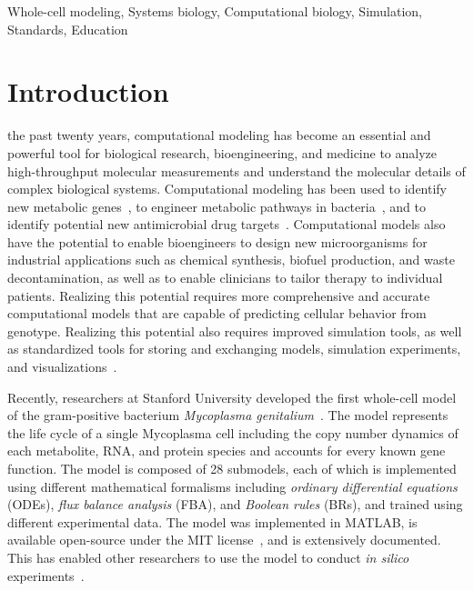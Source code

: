 \documentclass[journal,transmag]{IEEEtran}
\begin{document}
\begin{IEEEkeywords}
Whole-cell modeling, Systems biology, Computational biology, Simulation, Standards, Education
\end{IEEEkeywords}

\IEEEpeerreviewmaketitle

\section{Introduction}

 the past twenty years, computational modeling has become an essential and powerful tool for biological research, bioengineering, and medicine to analyze high-throughput molecular measurements and understand the molecular details of complex biological systems. Computational modeling has been used to identify new metabolic genes~\cite{Reed2006}, to engineer metabolic pathways in bacteria~\cite{Lee2012}, and to identify potential new antimicrobial drug targets~\cite{Lee2009}.
Computational models also have the potential to enable bioengineers to design new microorganisms for industrial applications such as chemical synthesis, biofuel production, and waste decontamination, as well as to enable clinicians to tailor therapy to individual patients. Realizing this potential requires more comprehensive and accurate computational models that are capable of predicting cellular behavior from genotype. Realizing this potential also requires improved simulation tools, as well as standardized tools for storing and exchanging models, simulation experiments, and visualizations~\cite{Macklin2014,Karr2015,Karr2015b,hucka2015promoting,Klipp07,path2models2013}.

Recently, researchers at Stanford University developed the first whole-cell model of the gram-positive bacterium \textit{Mycoplasma genitalium}~\cite{Karr2012}. The model represents the life cycle of a single Mycoplasma cell including the copy number dynamics of each metabolite, RNA, and protein species and accounts for every known gene function. The model is composed of 28 submodels, each of which is implemented using different mathematical formalisms including \emph{ordinary differential equations} (ODEs), \emph{flux balance analysis} (FBA), and \emph{Boolean rules} (BRs), and trained using different experimental data. 
The model was implemented in MATLAB, is available open-source under the MIT license~\cite{wholeCell}, and is extensively documented. This has enabled other researchers to use the model to conduct \textit{in silico} experiments~\cite{Sanghvi2013, Purcell2013, Kazakiewicz2015}. 
\end{document}
